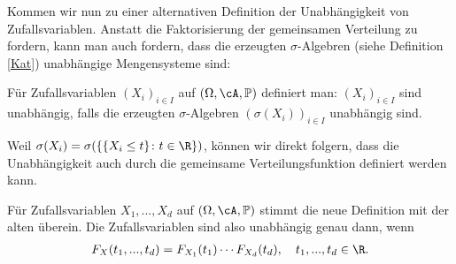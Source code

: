 Kommen wir nun zu einer alternativen Definition der Unabh\"angigkeit von Zufallsvariablen. Anstatt die Faktorisierung der gemeinsamen Verteilung zu fordern, kann man auch fordern, dass die erzeugten $\sigma$-Algebren (siehe Definition \ref{Kat}) unabh\"angige Mengensysteme sind:
\begin{deff}\label{unab}
	Für Zufallsvariablen $(X_i)_{i \in I}$ auf $(\Omega, \cA, \mathbb{P})$ definiert man: $(X_i)_{i \in I}$ sind unabhängig, falls die erzeugten $\sigma$-Algebren $(\sigma(X_i))_{i \in I}$ unabhängig sind. 
\end{deff}
Weil $\sigma(X_i) = \sigma(\{ \{X_i \leq t \}\colon t \in \R \})$, k\"onnen wir direkt folgern, dass die Unabh\"angigkeit auch durch die gemeinsame Verteilungsfunktion definiert werden kann.
\begin{korollar}
	Für Zufallsvariablen $X_1,...,X_d$ auf $(\Omega, \cA, \mathbb{P})$ stimmt die neue Definition mit der alten überein. Die Zufallsvariablen sind also unabh\"angig genau dann, wenn 
	\begin{align*}
		F_X(t_1,..., t_d)=F_{X_1}(t_1)\cdots F_{X_d}(t_d),\quad t_1,..., t_d\in \R.
	\end{align*}
\end{korollar}


